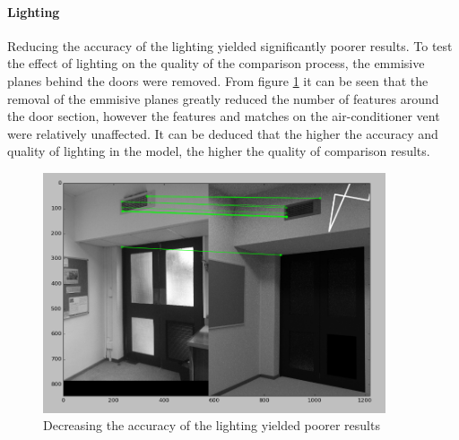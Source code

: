 \documentclass[11pt,a4paper]{report}
\begin{document}
				\paragraph{Lighting}
					Reducing the accuracy of the lighting yielded significantly poorer results.
					To test the effect of lighting on the quality of the comparison process, the emmisive planes behind the doors were removed. From figure \ref{fig:reduced_lighting_results} it can be seen that the removal of the emmisive planes greatly reduced the number of features around the door section, however the features and matches on the air-conditioner vent were relatively unaffected. It can be deduced that the higher the accuracy and quality of lighting in the model, the higher the quality of comparison results.
					\begin{figure}[H]
						\centering
						\includegraphics[width=0.9\textwidth]{reduced_lighting_results}
						\caption{Decreasing the accuracy of the lighting yielded poorer results}
						\label{fig:reduced_lighting_results}
					\end{figure}
					
\end{document}
